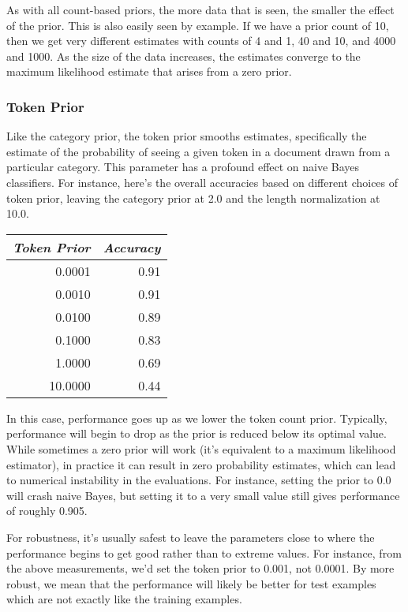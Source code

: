 As with all count-based priors, the more data that is seen,
the smaller the effect of the prior.  This is also easily
seen by example.  If we have a prior count of 10, then
we get very different estimates with counts of 4 and 1,
40 and 10, and 4000 and 1000.  As the size of the data
increases, the estimates converge to the maximum likelihood
estimate that arises from a zero prior.


\subsubsection{Token Prior}

Like the category prior, the token prior smooths estimates,
specifically the estimate of the probability of seeing a given token
in a document drawn from a particular category.  This parameter has a
profound effect on naive Bayes classifiers.  For instance, here's
the overall accuracies based on different choices of token prior,
leaving the category prior at 2.0 and the length normalization at 10.0.
%
\begin{center}
\begin{tabular}{r|r}
{\it Token Prior} & {\it Accuracy} 
\\ \hline
0.0001 & 0.91
\\
 0.0010 & 0.91
\\
 0.0100 & 0.89
\\
 0.1000 & 0.83
\\
 1.0000 & 0.69
\\
10.0000 & 0.44
\end{tabular}
\end{center}
%
In this case, performance goes up as we lower the token count prior.
Typically, performance will begin to drop as the prior is reduced
below its optimal value.  While sometimes a zero prior will work (it's
equivalent to a maximum likelihood estimator), in practice it can
result in zero probability estimates, which can lead to numerical
instability in the evaluations.  For instance, setting the prior to
0.0 will crash naive Bayes, but setting it to a very small value still
gives performance of roughly 0.905.  

For robustness, it's usually safest to leave the parameters
close to where the performance begins to get good rather than to
extreme values.  For instance, from the above measurements, we'd
set the token prior to 0.001, not 0.0001.  By more robust, we mean
that the performance will likely be better for test examples
which are not exactly like the training examples.

